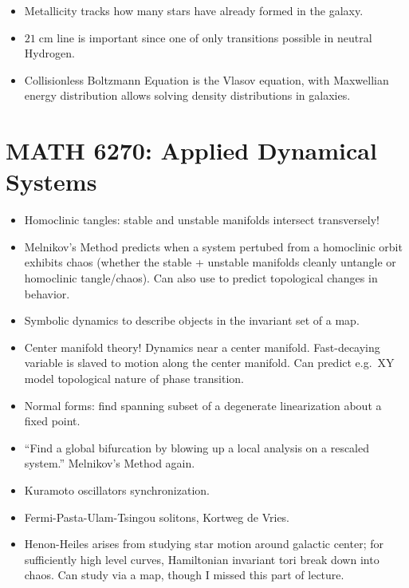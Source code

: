 \documentclass[11pt,
        usenames, %
        dvipsnames %
    ]{article}
\begin{document}
\begin{itemize}
    \item Metallicity tracks how many stars have already formed in the galaxy.

    \item $21\;\mathrm{cm}$ line is important since one of only transitions
        possible in neutral Hydrogen.

    \item Collisionless Boltzmann Equation is the Vlasov equation, with
        Maxwellian energy distribution allows solving density distributions in
        galaxies.
\end{itemize}

\section{MATH 6270: Applied Dynamical Systems}

\begin{itemize}
    \item Homoclinic tangles: stable and unstable manifolds intersect
        transversely!
    \item Melnikov's Method predicts when a system pertubed from a homoclinic
        orbit exhibits chaos (whether the stable + unstable manifolds cleanly
        untangle or homoclinic tangle/chaos). Can also use to predict
        topological changes in behavior.

    \item Symbolic dynamics to describe objects in the invariant set of a map.

    \item Center manifold theory! Dynamics near a center manifold. Fast-decaying
        variable is slaved to motion along the center manifold. Can predict
        e.g.\ XY model topological nature of phase transition.

    \item Normal forms: find spanning subset of a degenerate linearization about
        a fixed point.

    \item ``Find a global bifurcation by blowing up a local analysis on a
        rescaled system.'' Melnikov's Method again.

    \item Kuramoto oscillators synchronization.

    \item Fermi-Pasta-Ulam-Tsingou solitons, Kortweg de Vries.

    \item Henon-Heiles arises from studying star motion around galactic center;
        for sufficiently high level curves, Hamiltonian invariant tori break
        down into chaos. Can study via a map, though I missed this part of
        lecture.
\end{itemize}
\end{document}
